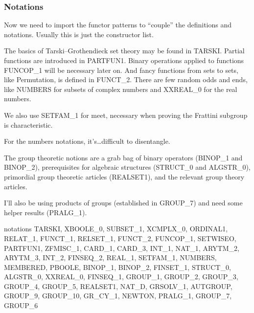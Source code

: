 \subsubsection{Notations}
Now we need to import the functor patterns to ``couple'' the definitions
and notations. Usually this is just the constructor list.

The basics of Tarski--Grothendieck set theory may be found in
{\Tt{}TARSKI\nwendquote}. Partial functions are introduced in {\Tt{}PARTFUN1\nwendquote}. Binary
operations applied to functions {\Tt{}FUNCOP{\_}1\nwendquote} will be necessary later
on. And fancy functions from sets to sets, like {\Tt{}Permutation\nwendquote}, is
defined in {\Tt{}FUNCT{\_}2\nwendquote}. There are few random odds and ends, like
{\Tt{}NUMBERS\nwendquote} for subsets of complex numbers and {\Tt{}XXREAL{\_}0\nwendquote} for the real
numbers.

We also use {\Tt{}SETFAM{\_}1\nwendquote} for {\Tt{}meet\nwendquote}, necessary when proving the
Frattini subgroup is characteristic.

For the numbers notations, it's\dots difficult to disentangle.

The group theoretic notions are a grab bag of binary operators
({\Tt{}BINOP{\_}1\nwendquote} and {\Tt{}BINOP{\_}2\nwendquote}), prerequisites for algebraic structures
({\Tt{}STRUCT{\_}0\nwendquote} and {\Tt{}ALGSTR{\_}0\nwendquote}), primordial group theoretic articles
({\Tt{}REALSET1\nwendquote}), and the relevant group theory articles.

I'll also be using products of groups (established in {\Tt{}GROUP{\_}7\nwendquote}) and
need some helper results ({\Tt{}PRALG{\_}1\nwendquote}).

\nwenddocs{}\endmoddef\nwstartdeflinemarkup{}\nwenddeflinemarkup
notations TARSKI, XBOOLE_0, SUBSET_1, XCMPLX_0, ORDINAL1, RELAT_1,
  FUNCT_1, RELSET_1, FUNCT_2, FUNCOP_1, SETWISEO, PARTFUN1,
  ZFMISC_1, CARD_1, CARD_3, INT_1, NAT_1, ARYTM_2, ARYTM_3, INT_2,
  FINSEQ_2, REAL_1, SETFAM_1, NUMBERS, MEMBERED, PBOOLE, BINOP_1,
  BINOP_2, FINSET_1, STRUCT_0, ALGSTR_0, XXREAL_0, FINSEQ_1, GROUP_1, GROUP_2,
  GROUP_3, GROUP_4, GROUP_5, REALSET1, NAT_D, GRSOLV_1,
  AUTGROUP, GROUP_9, GROUP_10, GR_CY_1, NEWTON, PRALG_1, GROUP_7, GROUP_6
\nwendcode{}\nwdocspar

